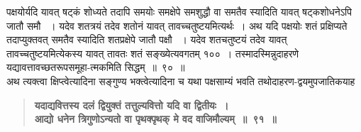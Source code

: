 \documentclass[11pt, openany]{book}
\begin{document}
\newpage

\begin{sloppypar}
\noindent पक्षयोर्यदि यावत् षट्कं शोध्यते तदापि समयोः समक्षेपे समशुद्धौ वा समतैव स्यादिति यावत् षट्कशोधनेऽपि जातौ समौ ~। यदेव शतत्रयं तदेव शतोनं यावत् तावच्चतुष्टयमित्यर्थः~। अथ यदि पक्षयोः शतं प्रक्षिप्यते तदाप्युक्तवत् समतैव स्यादिति शतप्रक्षेपे जातौ पक्षौ ~। यदेव शतचतुष्टयं तदेव यावत् तावच्चतुष्टयमित्येकस्य यावत् तावतः शतं सङ्ख्येत्यवगतम् १००~। तस्मादस्मिन्नुदाहरणे यद्यावत्तावच्छतरूपसमूहा-त्मकमिति सिद्धम्~॥~९०~॥\\

{\small अथ त्यक्त्वा क्षिप्त्वेत्यादिना सङ्गुण्य भक्त्वेत्यादिना च यथा पक्षसाम्यं भवति तथोदाहरण-द्वयमुपजातिकयाह\textendash }

 \label{7.91}
\begin{quote}
{\large \textbf{{\color{purple}यदाद्यवित्तस्य दलं द्वियुक्तं तत्तुल्यवित्तो यदि वा द्वितीयः~।\\
आद्यो धनेन त्रिगुणोऽन्यतो वा पृथक्पृथक् मे वद वाजिमौल्यम्~॥~९१~॥}}}
\end{quote}


\end{sloppypar}
\end{document}
